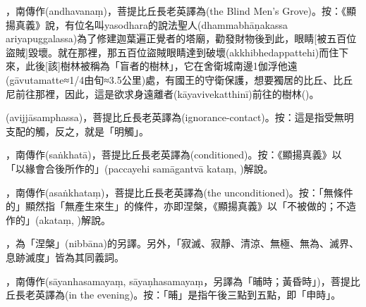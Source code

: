 \startitemgroup[noteitems]
\item{}，南傳作(andhavanaṃ)，菩提比丘長老英譯為(the Blind Men's Grove)。按：《顯揚真義》說，有位名叫yasodhara的說法聖人(dhammabhāṇakassa ariyapuggalassa)為了修建迦葉遍正覺者的塔廟，勸發財物後到此，眼睛[被五百位盜賊]毀壞。就在那裡，那五百位盜賊眼睛達到破壞(akkhibhedappattehi)而住下來，此後[該]樹林被稱為「盲者的樹林」，它在舍衛城南邊1伽浮他遠(gāvutamatte≈1/4由旬≈3.5公里)處，有國王的守衛保護，想要獨居的比丘、比丘尼前往那裡，因此，這是欲求身遠離者(kāyavivekatthinī)前往的樹林()。
\stopitemgroup

\startitemgroup[noteitems]
\item{}(avijjāsamphassa)，菩提比丘長老英譯為(ignorance-contact)。按：這是指受無明支配的觸，反之，就是「明觸」。
\stopitemgroup

\startitemgroup[noteitems]
\item{}，南傳作(saṅkhatā)，菩提比丘長老英譯為(conditioned)。按：《顯揚真義》以「以緣會合後所作的」(paccayehi samāgantvā kataṃ, )解說。
\item{}，南傳作(asaṅkhataṃ)，菩提比丘長老英譯為(the unconditioned)。按：「無條件的」顯然指「無產生來生」的條件，亦即涅槃，《顯揚真義》以「不被做的；不造作的」(akataṃ, )解說。
\item{}，為「涅槃」(nibbāna)的另譯。另外，「寂滅、寂靜、清涼、無極、無為、滅界、息跡滅度」皆為其同義詞。
\stopitemgroup

\startitemgroup[noteitems]
\item{}，南傳作(sāyanhasamayaṃ, sāyaṇhasamayaṃ，另譯為「晡時；黃昏時」)，菩提比丘長老英譯為(in the evening)。按：「晡」是指午後三點到五點，即「申時」。
\stopitemgroup

